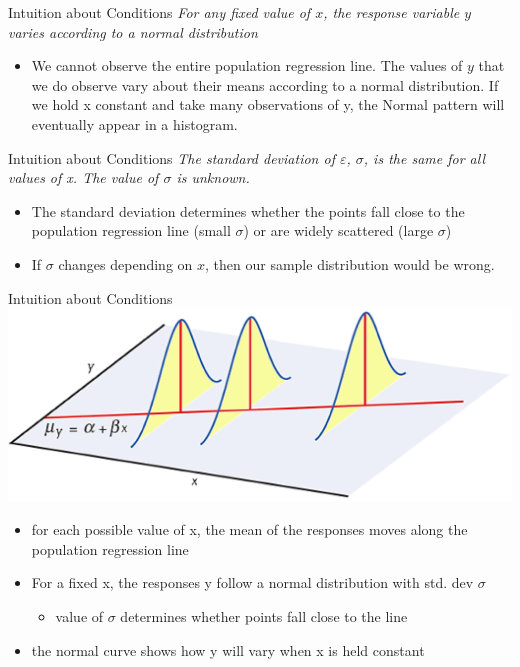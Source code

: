 \documentclass{beamer}
\begin{document}
\begin{frame}{Intuition about Conditions}
	\textit{For any fixed value of $x$, the response variable $y$ varies according to a normal distribution}
	
	\begin{itemize}
		\item We cannot observe the entire population regression line. The values of $y$ that we do observe vary about their means according to a normal distribution. If we hold x constant and take many observations of y, the Normal pattern will eventually appear in a histogram. 
	\end{itemize}
\end{frame}

\begin{frame}{Intuition about Conditions}
	\textit{The \alert{standard deviation} of $\varepsilon$, $\sigma$, is the same for all values of x. The value of $\sigma$ is unknown.}
	
	\begin{itemize}
		\item The standard deviation determines whether the points fall close to the population regression line (small $\sigma$) or are widely scattered (large $\sigma$)
			  
		\item If $\sigma$ changes depending on $x$, then our sample distribution would be wrong.
	\end{itemize}
\end{frame}

\begin{frame}{Intuition about Conditions}
	\includegraphics[width=.9\textwidth]{conditions}
	\begin{itemize}
		\item for each possible value of x, the mean of the responses moves along the population regression line
		\item For a fixed x, the responses y follow a normal distribution with std. dev $\sigma$
		      \begin{itemize}
		      	\item value of $\sigma$ determines whether points fall close to the line
		      \end{itemize}
		\item the normal curve shows how y will vary when x is held constant
	\end{itemize}
\end{frame}
\end{document}

